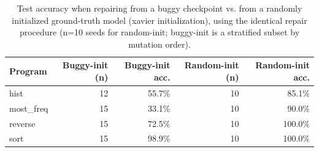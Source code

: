 \begin{table}[t]
\centering
\caption{Test accuracy when repairing from a buggy checkpoint vs. from a randomly initialized ground-truth model (xavier initialization), using the identical repair procedure (n=10 seeds for random-init; buggy-init is a stratified subset by mutation order).}
\label{tab:init-controls}
\begin{tabular}{lrrrr}
\toprule
Program & Buggy-init (n) & Buggy-init acc. & Random-init (n) & Random-init acc. \\
\midrule
hist & 12 & 55.7\% & 10 & 85.1\% \\
most_freq & 15 & 33.1\% & 10 & 90.0\% \\
reverse & 15 & 72.5\% & 10 & 100.0\% \\
sort & 15 & 98.9\% & 10 & 100.0\% \\
\bottomrule
\end{tabular}
\end{table}
